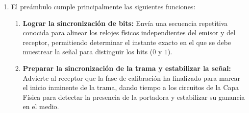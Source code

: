 \documentclass[11pt,a4paper]{article}
\begin{document}
\begin{enumerate}[label=\arabic*)]
\begin{enumerate}[label=\alph*)]
                \begin{itemize}
                  \item \textbf{Encabezado (header):} Va al principio de la trama. Contiene metadatos de control: direcciones de origen/destino, número de secuencia, tipo de protocolo, longitud, flags de sincronización, etc.
                  \item \textbf{Carga útil (payload):} Es el contenido real que se quiere transmitir, siendo estos los datos provenientes de la capa superior.
                  \item \textbf{Tráiler (trailer):} Va al final de la trama. Normalmente contiene información para el control de errores, que permite al receptor verificar si la trama llegó íntegra. En algunos protocolos también puede incluir un delimitador de fin de trama.
                \end{itemize}

                \textbf{Diferencia clave:} el header y el trailer son información de control agregada por la capa de Enlace de Datos, mientras que el payload es el dato ``real'' que se está transportando y que en definitiva le interesa a la capa superior. El header suele enfocarse en identificación/direccionamiento/sincronización, y el trailer suele enfocarse en la detección de errores.
          \item
                El preámbulo cumple principalmente las siguientes funciones:

                \begin{enumerate}[label=\arabic*)]
                  \item \textbf{Lograr la sincronización de bits:} Envía una secuencia repetitiva conocida para alinear los relojes físicos independientes del emisor y del receptor, permitiendo determinar el instante exacto en el que se debe muestrear la señal para distinguir los bits ($0$ y $1$).
                  \item \textbf{Preparar la sincronización de la trama y estabilizar la señal:} Advierte al receptor que la fase de calibración ha finalizado para marcar el inicio inminente de la trama, dando tiempo a los circuitos de la Capa Física para detectar la presencia de la portadora y estabilizar su ganancia en el medio.
                \end{enumerate}


\end{enumerate}
\end{enumerate}
\end{document}

